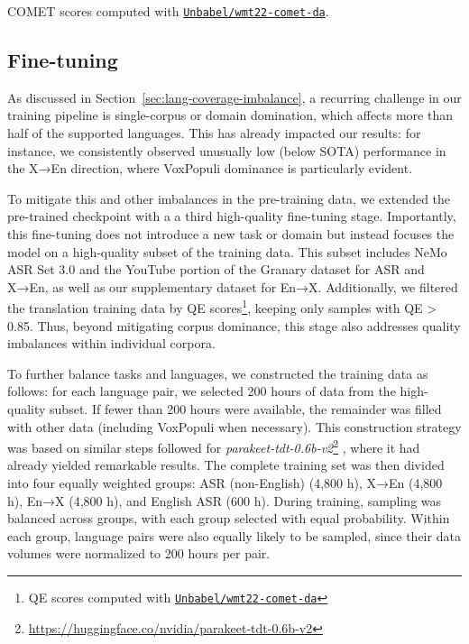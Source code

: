 \begin{table}[t]
\begin{threeparttable}
\caption{Comparison of Two-stage vs. Single-stage models across ASR and AST benchmarks.}
\label{tab:asr-ast-pre-training-stages}

\begin{tablenotes}
\centering
\small
\item[$^{*}$] COMET scores computed with \href{https://huggingface.co/Unbabel/wmt22-comet-da}{\texttt{Unbabel/wmt22-comet-da}}.
\end{tablenotes}

\end{threeparttable}
\end{table}


\subsection{Fine-tuning}
\label{sec:fine-tuning}

As discussed in Section~\ref{sec:lang-coverage-imbalance}, a recurring challenge in our training pipeline is single-corpus or domain domination, which affects more than half of the supported languages. This has already impacted our results: for instance, we consistently observed unusually low (below SOTA) performance in the X→En direction, where VoxPopuli dominance is particularly evident.

To mitigate this and other imbalances in the pre-training data, we extended the pre-trained checkpoint with a a third high-quality fine-tuning stage. Importantly, this fine-tuning does not introduce a new task or domain but instead focuses the model on a high-quality subset of the training data. This subset includes NeMo ASR Set 3.0 and the YouTube portion of the Granary dataset for ASR and X→En, as well as our supplementary dataset for En→X. Additionally, we filtered the translation training data by QE scores\footnote{QE scores computed with \href{https://huggingface.co/Unbabel/wmt22-comet-da}{\texttt{Unbabel/wmt22-comet-da}}}\cite{cometoid}, keeping only samples with QE > 0.85. Thus, beyond mitigating corpus dominance, this stage also addresses quality imbalances within individual corpora.

To further balance tasks and languages, we constructed the training data as follows: for each language pair, we selected 200 hours of data from the high-quality subset. If fewer than 200 hours were available, the remainder was filled with other data (including VoxPopuli when necessary). This construction strategy was based on similar steps followed for 
\emph{parakeet-tdt-0.6b-v2}\footnote{\url{https://huggingface.co/nvidia/parakeet-tdt-0.6b-v2}}
, where it had already yielded remarkable results. The complete training set was then divided into four equally weighted groups: ASR (non-English) (4,800 h), X→En (4,800 h), En→X (4,800 h), and English ASR (600 h). During training, sampling was balanced across groups, with each group selected with equal probability. Within each group, language pairs were also equally likely to be sampled, since their data volumes were normalized to 200 hours per pair.

